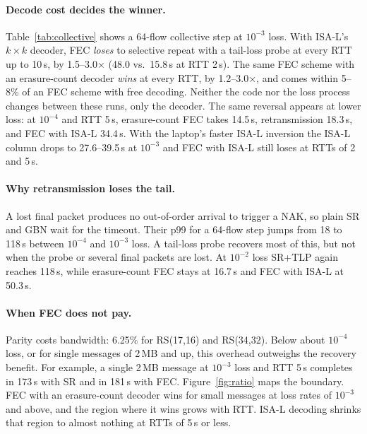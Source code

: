 \paragraph{Decode cost decides the winner.} Table~\ref{tab:collective} shows a 64-flow collective
step at $10^{-3}$ loss. With ISA-L's $k\times k$ decoder, FEC \emph{loses} to selective repeat with a
tail-loss probe at every RTT up to 10\,\textmu s, by 1.5--3.0$\times$ (48.0 vs.\ 15.8\,\textmu s at
RTT 2\,\textmu s). The same FEC scheme with an erasure-count decoder \emph{wins} at every RTT, by
1.2--3.0$\times$, and comes within 5--8\% of an FEC scheme with free decoding. Neither the code nor
the loss process changes between these runs, only the decoder. The same reversal appears at lower
loss: at $10^{-4}$ and RTT 5\,\textmu s, erasure-count FEC takes 14.5\,\textmu s, retransmission
18.3\,\textmu s, and FEC with ISA-L 34.4\,\textmu s. With the laptop's faster ISA-L inversion the
ISA-L column drops to 27.6--39.5\,\textmu s at $10^{-3}$ and FEC with ISA-L still loses at RTTs of 2
and 5\,\textmu s.

\paragraph{Why retransmission loses the tail.} A lost final packet produces no out-of-order arrival
to trigger a NAK, so plain SR and GBN wait for the timeout. Their p99 for a 64-flow step jumps from
18 to 118\,\textmu s between $10^{-4}$ and $10^{-3}$ loss. A tail-loss probe recovers most of this,
but not when the probe or several final packets are lost. At $10^{-2}$ loss SR+TLP again reaches
118\,\textmu s, while erasure-count FEC stays at 16.7\,\textmu s and FEC with ISA-L at 50.3\,\textmu s.

\paragraph{When FEC does not pay.} Parity costs bandwidth: 6.25\% for RS(17,16) and RS(34,32).
Below about $10^{-4}$ loss, or for single messages of 2\,MB and up, this overhead outweighs the
recovery benefit. For example, a single 2\,MB message at $10^{-3}$ loss and RTT 5\,\textmu s
completes in 173\,\textmu s with SR and in 181\,\textmu s with FEC. Figure~\ref{fig:ratio} maps the
boundary. FEC with an erasure-count decoder wins for small messages at loss rates of $10^{-3}$ and
above, and the region where it wins grows with RTT. ISA-L decoding shrinks that region to almost
nothing at RTTs of 5\,\textmu s or less.

